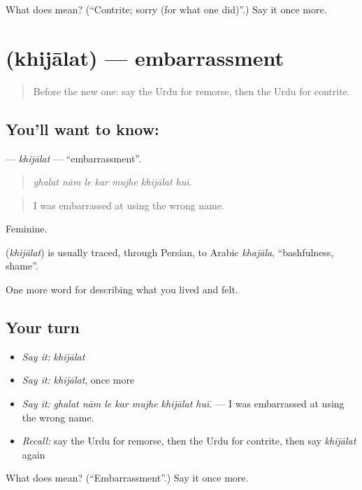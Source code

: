 \begin{tcolorbox}[breakable,colback=teal!4,colframe=teal!35!black,title={Before you move on}]
What does  mean? (\textquotedblleft{}Contrite; sorry (for what one did)\textquotedblright{}.) Say it once more.
\end{tcolorbox}
\section[\texorpdfstring{\ur{خجالت} (khijālat)}{خجالت (khijālat)}]{ (khijālat) — embarrassment}

\label{lesson:UR-C451-khijalat}



\begin{quote}
Before the new one: say the Urdu for remorse, then the Urdu for contrite.
\end{quote}

\subsection*{You'll want to know: }
\textbf{} — \emph{khijālat} — \textquotedblleft{}embarrassment\textquotedblright{}.

\begin{quote}
      
\end{quote}

\begin{quote}
\emph{ghalat nām le kar mujhe khijālat huī.}
\end{quote}

\begin{quote}
I was embarrassed at using the wrong name.
\end{quote}

Feminine.

\begin{cousinweb}
\textbf{} (\emph{khijālat}) is usually traced, through Persian, to Arabic \emph{khajāla}, \textquotedblleft{}bashfulness, shame\textquotedblright{}.
\end{cousinweb}

\begin{grammarlens}[title={What you've built}]
One more word for describing what you lived and felt.
\end{grammarlens}

\subsection*{Your turn}
\begin{itemize}
\raggedright
  \item \emph{Say it:} \emph{khijālat}
  \item \emph{Say it:} \emph{khijālat}, once more
  \item \emph{Say it:} \emph{ghalat nām le kar mujhe khijālat huī.} — I was embarrassed at using the wrong name.
  \item \emph{Recall:} say the Urdu for remorse, then the Urdu for contrite, then say \emph{khijālat} again
\end{itemize}

\begin{tcolorbox}[breakable,colback=teal!4,colframe=teal!35!black,title={Before you move on}]
What does  mean? (\textquotedblleft{}Embarrassment\textquotedblright{}.) Say it once more.
\end{tcolorbox}
